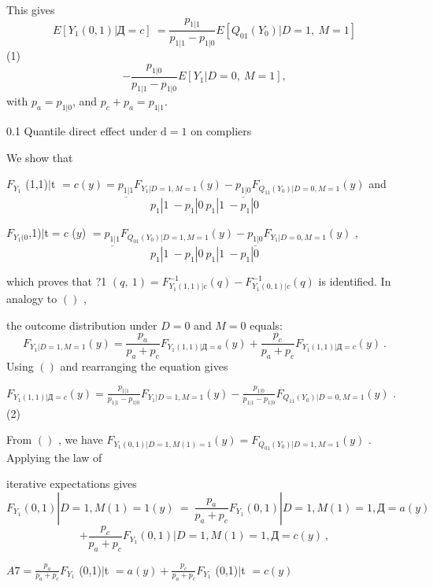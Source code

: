 \documentclass[a4paper,12pt]{article}
\begin{document}
This gives
$$
E[Y_{1}(0,1)|Д=c]\ =\frac{p_{1|1}}{p_{1|1}-p_{1|0}}E[Q_{01}(Y_{0})|D=1,\ M=1]
$$
(1)
$$
-\frac{p_{1|0}}{p_{1|1}-p_{1|0}}E[Y_{1}|D=0,\ M=1],
$$
with $p_{a}=p_{1|0}$, and $p_{c}+p_{a}=p_{1|1}.$

0.1 Quantile direct effect under $\mathrm{d}=1$ on compliers

We show that

$F_{Y_{1}}$ (1,1)$|$t $=c(y) = \underline{p_{1|1}}F_{Y_{1}|D=1,M=1}(y) - \underline{p_{1|0}}F_{Q_{11}(Y_{0})|D=0,M=1}(y)$ and
$$
p_{1}|1\ -p_{1}|0\ p_{1}|1\ -p_{1}|0
$$
\begin{center}
$F_{Y_{1}(0}$,1)$|$t$=c$ ($y$) $= \underline{p_{1|1}}F_{Q_{01}(Y_{0})|D=1,M=1}(y) - \underline{p_{1|0}}F_{Y_{1}|D=0,M=1}(y)$ ,
$$
p_{1}|1\ -p_{1}|0\ p_{1}|1\ -p_{1}|0
$$
\end{center}
which proves that ?1 $(q,\ 1)=F_{Y_{1}(1,1)|c}^{-1}(q)-F_{Y_{1}(0,1)|c}^{-1}(q)$ is identified. In analogy to $()$ ,

the outcome distribution under $D=0$ and $M=0$ equals:
$$
F_{Y_{1}|D=1,M=1}(y)=\frac{p_{a}}{p_{a}+p_{c}}F_{Y_{1}(1,1)|Д=a}(y)+\frac{p_{c}}{p_{a}+p_{c}}F_{Y_{1}(1,1)|Д=c}(y)\ .
$$
Using $()$ and rearranging the equation gives

$F_{Y_{1}(1,1)|Д=c}(y)=\displaystyle \frac{p_{1|1}}{p_{1|1}-p_{1|0}}F_{Y_{1}|D=1,M=1}(y)-\frac{p_{1|0}}{p_{1|1}-p_{1|0}}F_{Q_{11}(Y_{0})|D=0,M=1}(y)$ . (2)

From $()$ , we have $F_{Y_{1}(0,1)|D=1,M(1)=1}(y) = F_{Q_{01}(Y_{0})|D=1,M=1}(y)$ . Applying the law of

iterative expectations gives
$$
F_{Y_{1}}(0,1)|D=1,M(1)=1(y)\ =\ \frac{p_{a}}{p_{a}+p_{c}}F_{Y_{1}}(0,1)|D=1,M(1)=1,Д=a(y)
$$
$$
+\frac{p_{c}}{p_{a}+p_{c}}F_{Y_{1}}(0,1)|D=1,M(1)=1,Д=c(y)\ ,
$$
\begin{center}
$A7= \displaystyle \frac{p_{a}}{p_{a}+p_{c}}F_{Y_{1}}$ (0,1)$|$t $=a(y) + \displaystyle \frac{p_{c}}{p_{a}+p_{c}}F_{Y_{1}}$ (0,1)$|$t $=c(y)$
\end{center}
\end{document}
